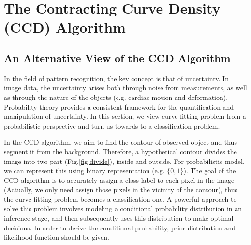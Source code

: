\section{The Contracting Curve Density (CCD) Algorithm}
\label{sec:sketch}

\subsection{An Alternative View of the CCD Algorithm}
\label{sec:overview}

In the field of pattern recognition, the key concept is that of
uncertainty. In image data, the uncertainty arises both
through noise from measurements, as well as through the nature of
the objects (e.g. cardiac motion and deformation). Probability theory
provides a consistent framework for the quantification and
manipulation of uncertainty.  In this section, we view curve-fitting
problem from a probabilistic perspective and turn us towards to
a classification problem.

In the CCD algorithm, we aim to find the contour of observed object
and thus segment it from the background. Therefore, a hypothetical 
contour divides the image into two part (Fig.\ref{fig:divide}), inside
and outside. For probabilistic model, we can represent this using
binary representation (e.g. $\{0, 1\}$). The goal of the CCD algorithm
is to accurately
assign a class label to each pixel in the image (Actually, we only need assign those pixels in the vicinity of the
contour), thus the curve-fitting problem becomes a classification
one. A powerful approach to solve this problem involves modeling a
conditional probability distribution in an inference stage, and then
subsequently uses this distribution to make optimal decisions. In
order to derive the conditional probability, prior distribution and
likelihood function should be given.

